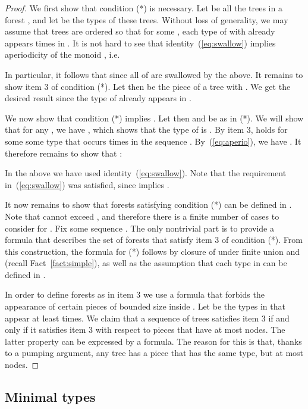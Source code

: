 \documentclass{LMCS}
\begin{document}
{\begin{proof}
We first show that condition (*) is necessary. Let  be
all the trees in a forest , and let  be
the types of these trees.  Without loss of generality, we may assume
that trees are ordered so that for some , each type of  with
 already appears  times in . It is not hard to see that identity~(\ref{eq:swallow}) implies aperiodicity of the monoid , i.e.~
 
In particular, it follows that  since all of
 are swallowed by the above. It remains to show
item 3 of condition (*). Let then  be the piece of a tree 
with . We get the desired result since the type of  already
appears in .

We now show that condition (*) implies . Let then  and  be as in (*). We will show that for any , we have , which shows that the type of  is . By
item 3,  holds for some some type  that occurs
 times in the sequence . By~(\ref{eq:aperio}),
we have . It therefore remains to show
that :

In the above we have used identity~(\ref{eq:swallow}). Note that the
requirement in~(\ref{eq:swallow}) was satisfied, since  implies .


It now remains to show that forests satisfying condition (*) can be defined in
\Stwo. Note that  cannot exceed , and therefore there
is a finite number of cases to consider for . Fix some sequence
.  The only nontrivial part is to provide a \Stwo formula
that describes the set of forests  that satisfy item 3
of condition (*). From this construction, the formula for (*) follows by
closure of \Stwo under finite union and  (recall
Fact~\ref{fact:simple}), as well as the assumption that each type in  can be
defined in \Stwo.

In order to define forests as in item 3 we use a  formula that forbids
the appearance of certain pieces of bounded size inside . Let  be the types in  that appear at least 
times. We claim that a sequence of trees  satisfies item 3
if and only if it satisfies item 3 with respect to pieces  that have at most
 nodes. The latter property can be expressed by a  formula.
The reason for this is that, thanks to a pumping argument, any tree has a piece
that has the same type, but at most  nodes.
\end{proof}

\subsection{Minimal types}

}
\end{document}
